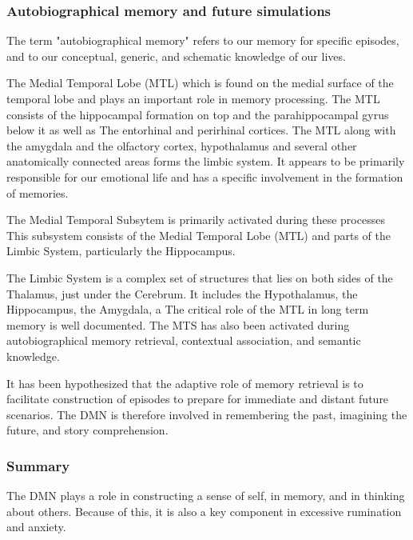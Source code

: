 \documentclass[a4paper, amsfonts, amssymb, amsmath, reprint, showkeys, nofootinbib, twoside]{revtex4-1}
\begin{document}
\subsubsection{Autobiographical memory and future simulations}
The term "autobiographical memory" refers to our memory for specific episodes, 
and to our conceptual, generic, and schematic knowledge of our lives.

The Medial Temporal Lobe (MTL) which is found on the medial surface of the temporal lobe and plays 
an important role in memory processing. 
The MTL consists of the hippocampal formation on top and the parahippocampal gyrus below it as well as
The entorhinal and perirhinal cortices. 
The MTL along with the amygdala and the olfactory cortex, hypothalamus and several other 
anatomically connected areas forms the limbic system. It appears to be primarily responsible for
our emotional life and has a specific involvement in the formation of memories. \cite{limbic}


The Medial Temporal Subsytem is primarily activated during these processes
This subsystem consists of the Medial Temporal Lobe (MTL) and parts of the Limbic
System, particularly the Hippocampus.

The Limbic System is a complex set of structures that lies on both sides of the
Thalamus, just under the Cerebrum. It includes the Hypothalamus, the Hippocampus, the
Amygdala, a
The critical role of the MTL in long term memory is well documented. \cite{mtl}
The MTS has also been activated during autobiographical memory retrieval,
contextual association, and semantic knowledge. \cite{defaultnetworkadaptive}

It has been hypothesized that the adaptive role of memory retrieval is to facilitate
construction of episodes to prepare for immediate and distant future scenarios. \cite{defaultnetworkadaptive}
The DMN is therefore involved in remembering the past, imagining the future, and story
comprehension. \cite{defaultnetworkadaptive}

\subsubsection{Summary}

The DMN plays a role in constructing a sense of self, in memory,
and in thinking about others. Because of this, it is also a key component in excessive
rumination and anxiety. \cite{dmndepression}
\end{document}

